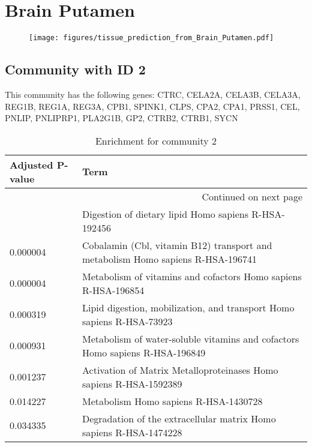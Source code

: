
\section*{Brain Putamen}
\begin{figure}[h!]
\centering
\texttt{[image: figures/tissue\_prediction\_from\_Brain\_Putamen.pdf]}
\end{figure}



\subsection*{Community with ID 2}
This community has the following genes: CTRC, CELA2A, CELA3B, CELA3A, REG1B, REG1A, REG3A, CPB1, SPINK1, CLPS, CPA2, CPA1, PRSS1, CEL, PNLIP, PNLIPRP1, PLA2G1B, GP2, CTRB2, CTRB1, SYCN
\\
\begin{longtable}{p{2.4cm}p{14.5cm}}
\caption{Enrichment for community 2}\\
\toprule
Adjusted \newline P-value &                                                                             Term \\
\midrule
\endhead
\midrule
\multicolumn{2}{r}{{Continued on next page}} \\
\midrule
\endfoot

\bottomrule
\endlastfoot
                 0.000003 &                             Digestion of dietary lipid Homo sapiens R-HSA-192456 \\
                 0.000004 &  Cobalamin (Cbl, vitamin B12) transport and metabolism Homo sapiens R-HSA-196741 \\
                 0.000004 &                   Metabolism of vitamins and cofactors Homo sapiens R-HSA-196854 \\
                 0.000319 &            Lipid digestion, mobilization, and transport Homo sapiens R-HSA-73923 \\
                 0.000931 &     Metabolism of water-soluble vitamins and cofactors Homo sapiens R-HSA-196849 \\
                 0.001237 &               Activation of Matrix Metalloproteinases Homo sapiens R-HSA-1592389 \\
                 0.014227 &                                            Metabolism Homo sapiens R-HSA-1430728 \\
                 0.034335 &               Degradation of the extracellular matrix Homo sapiens R-HSA-1474228 \\
\end{longtable}


